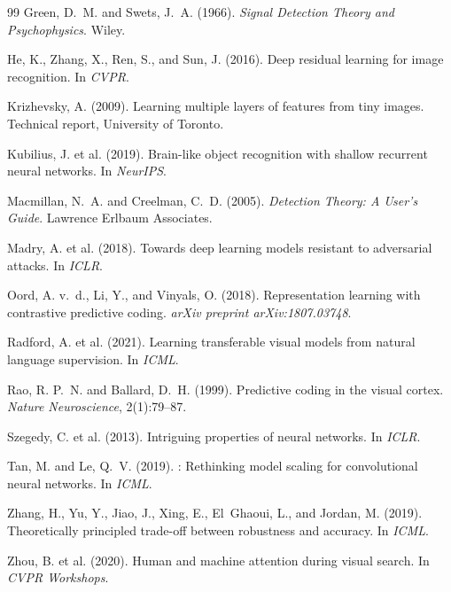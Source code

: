 \documentclass[12pt,a4paper]{article}
\begin{document}
\begin{thebibliography}{99}
Green, D.~M. and Swets, J.~A. (1966).
\newblock \emph{Signal Detection Theory and Psychophysics}.
\newblock Wiley.

He, K., Zhang, X., Ren, S., and Sun, J. (2016).
\newblock Deep residual learning for image recognition.
\newblock In \emph{CVPR}.

Krizhevsky, A. (2009).
\newblock Learning multiple layers of features from tiny images.
\newblock Technical report, University of Toronto.

Kubilius, J. et al. (2019).
\newblock Brain-like object recognition with shallow recurrent neural networks.
\newblock In \emph{NeurIPS}.

Macmillan, N.~A. and Creelman, C.~D. (2005).
\newblock \emph{Detection Theory: A User's Guide}.
\newblock Lawrence Erlbaum Associates.

Madry, A. et al. (2018).
\newblock Towards deep learning models resistant to adversarial attacks.
\newblock In \emph{ICLR}.

Oord, A. v.~d., Li, Y., and Vinyals, O. (2018).
\newblock Representation learning with contrastive predictive coding.
\newblock \emph{arXiv preprint arXiv:1807.03748}.

Radford, A. et al. (2021).
\newblock Learning transferable visual models from natural language supervision.
\newblock In \emph{ICML}.

Rao, R. P.~N. and Ballard, D.~H. (1999).
\newblock Predictive coding in the visual cortex.
\newblock \emph{Nature Neuroscience}, 2(1):79--87.

Szegedy, C. et al. (2013).
\newblock Intriguing properties of neural networks.
\newblock In \emph{ICLR}.

Tan, M. and Le, Q.~V. (2019).
: Rethinking model scaling for convolutional neural
  networks.
\newblock In \emph{ICML}.

Zhang, H., Yu, Y., Jiao, J., Xing, E., El~Ghaoui, L., and Jordan, M. (2019).
\newblock Theoretically principled trade-off between robustness and accuracy.
\newblock In \emph{ICML}.

Zhou, B. et al. (2020).
\newblock Human and machine attention during visual search.
\newblock In \emph{CVPR Workshops}.

\end{thebibliography}
\end{document}

